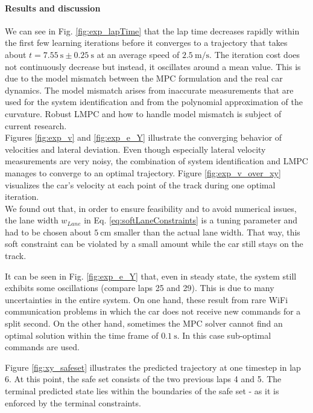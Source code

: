 \paragraph{Results and discussion}
We can see in Fig. \ref{fig:exp_lapTime} that the lap time decreases rapidly within the first few learning iterations before it converges to a trajectory that takes about $t=\SI{7.55}{\second} \pm \SI{0.25}{\second}$ at an average speed of $\SI{2.5}{\meter\per\second}$. The iteration cost does not continuously decrease but instead, it oscillates around a mean value. This is due to the model mismatch between the MPC formulation and the real car dynamics. The model mismatch arises from inaccurate measurements that are used for the system identification and from the polynomial approximation of the curvature. Robust LMPC and how to handle model mismatch is subject of current research.\\
Figures \ref{fig:exp_v} and \ref{fig:exp_e_Y} illustrate the converging behavior of velocities and lateral deviation. Even though especially lateral velocity measurements are very noisy, the combination of system identification and LMPC manages to converge to an optimal trajectory.
Figure \ref{fig:exp_v_over_xy} visualizes the car's velocity at each point of the track during one optimal iteration.%
\\
We found out that, in order to ensure feasibility and to avoid numerical issues, the lane width $w_{Lane}$ in Eq. \eqref{eq:softLaneConstraints} is a tuning parameter and had to be chosen about $\SI{5}{\centi\meter}$ smaller than the actual lane width. That way, this soft constraint can be violated by a small amount while the car still stays on the track.

It can be seen in Fig. \ref{fig:exp_e_Y} that, even in steady state, the system still exhibits some oscillations (compare laps 25 and 29). This is due to many uncertainties in the entire system. On one hand, these result from rare WiFi communication problems in which the car does not receive new commands for a split second. On the other hand, sometimes the MPC solver cannot find an optimal solution within the time frame of $\SI{0.1}{\second}$. In this case sub-optimal commands are used.

Figure \ref{fig:xy_safeset} illustrates the predicted trajectory at one timestep in lap 6. At this point, the safe set consists of the two previous laps 4 and 5. The terminal predicted state lies within the boundaries of the safe set - as it is enforced by the terminal constraints.

